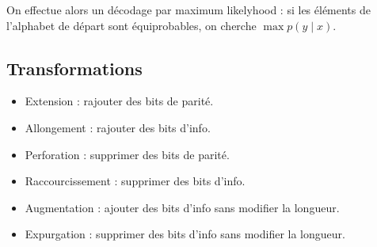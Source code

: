 	On effectue alors un décodage par maximum likelyhood : si les éléments de l'alphabet de départ sont équiprobables, on cherche $\max p(y \mid x)$.


\subsection{Transformations}

	\begin{itemize}
		\item[\textbullet] Extension : rajouter des bits de parité.
		\item[\textbullet] Allongement : rajouter des bits d'info.
		\item[\textbullet] Perforation : supprimer des bits de parité.
		\item[\textbullet] Raccourcissement : supprimer des bits d'info.
		\item[\textbullet] Augmentation : ajouter des bits d'info sans modifier la longueur.
		\item[\textbullet] Expurgation : supprimer des bits d'info sans modifier la longueur.
	\end{itemize}

